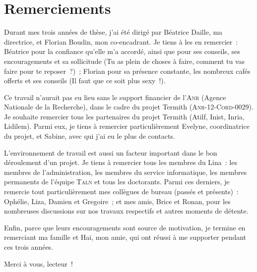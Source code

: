 \chapter*{Remerciements}
\label{chap:main-acknowledgment}
  Durant mes trois années de thèse, j'ai été dirigé par Béatrice Daille, ma
  directrice, et Florian Boudin, mon co-encadrant. Je tiens à les en remercier~:
  Béatrice pour la confiance qu'elle m'a accordé, ainsi que pour ses conseils,
  ses encouragements et sa sollicitude (\og{}Tu as plein de choses à faire,
  comment tu vas faire pour te reposer~?\fg{})~; Florian pour sa présence
  constante, les nombreux cafés offerts et ses conseils (\og{}Il faut que ce
  soit plus sexy~!\fg{}).

  Ce travail n'aurait pas eu lieu sans le support financier de l'\textsc{Anr}
  (Agence Nationale de la Recherche), dans le cadre du projet Termith
  (\textsc{Anr}-12-\textsc{Cord}-0029). Je souhaite remercier tous les
  partenaires du projet Termith (Atilf, Inist, Inria, Lidilem). Parmi eux, je
  tiens à remercier particulièrement Evelyne, coordinatrice du projet, et
  Sabine, avec qui j'ai eu le plus de contacts.

  L'environnement de travail est aussi un facteur important dans le bon
  déroulement d'un projet. Je tiens à remercier tous les membres du Lina~:
  les membres de l'administration, les membres du service informatique, les
  membres permanents de l'équipe \textsc{Taln} et tous les doctorants. Parmi ces
  derniers, je remercie tout particulièrement mes collègues de bureau (passés et
  présents)~: Ophélie, Liza, Damien et Gregoire~; et mes amis, Brice et Ronan,
  pour les nombreuses discussions sur nos travaux respectifs et autres moments
  de détente.

  Enfin, parce que leurs encouragements sont source de motivation, je termine en
  remerciant ma famille et Hai, mon amie, qui ont réussi à me supporter pendant
  ces trois années.

  \vfill{}\hfill{}Merci à vous, lecteur~!

